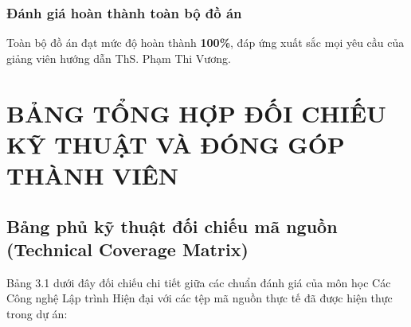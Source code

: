\documentclass[13pt,a4paper]{extarticle}
\begin{document}
\subsubsection{Đánh giá hoàn thành toàn bộ đồ án}
Toàn bộ đồ án đạt mức độ hoàn thành \textbf{100\%}, đáp ứng xuất sắc mọi yêu cầu của giảng viên hướng dẫn ThS. Phạm Thi Vương.

\newpage
\section{BẢNG TỔNG HỢP ĐỐI CHIẾU KỸ THUẬT VÀ ĐÓNG GÓP THÀNH VIÊN}

\subsection{Bảng phủ kỹ thuật đối chiếu mã nguồn (Technical Coverage Matrix)}
Bảng 3.1 dưới đây đối chiếu chi tiết giữa các chuẩn đánh giá của môn học Các Công nghệ Lập trình Hiện đại với các tệp mã nguồn thực tế đã được hiện thực trong dự án:
\end{document}
